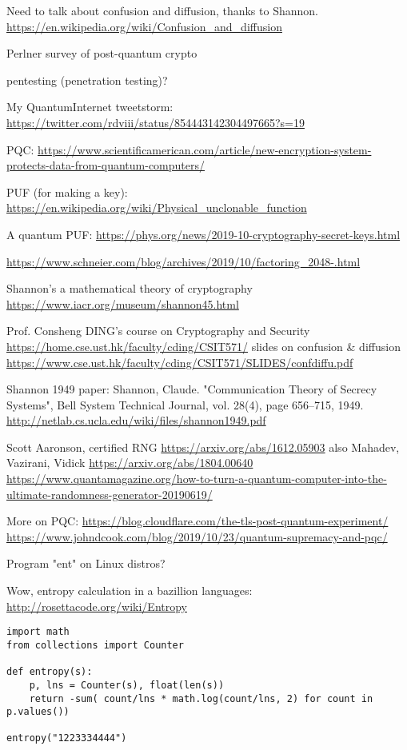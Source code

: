 \documentclass[%
 aip,
 jmp,%
 amsmath,amssymb,
 reprint,%
]{revtex4-1}
\begin{document}
Need to talk about confusion and diffusion, thanks to Shannon.
\url{https://en.wikipedia.org/wiki/Confusion_and_diffusion}

Perlner survey of post-quantum crypto

pentesting (penetration testing)?

My QuantumInternet tweetstorm:
\url{https://twitter.com/rdviii/status/854443142304497665?s=19}

PQC:
\url{https://www.scientificamerican.com/article/new-encryption-system-protects-data-from-quantum-computers/}

PUF (for making a key):
\url{https://en.wikipedia.org/wiki/Physical_unclonable_function}

A quantum PUF:
\url{https://phys.org/news/2019-10-cryptography-secret-keys.html}

\url{https://www.schneier.com/blog/archives/2019/10/factoring_2048-.html}

Shannon's a mathematical theory of cryptography
\url{https://www.iacr.org/museum/shannon45.html}

Prof. Consheng DING's course on Cryptography and Security
\url{https://home.cse.ust.hk/faculty/cding/CSIT571/}
slides on confusion \& diffusion
\url{https://www.cse.ust.hk/faculty/cding/CSIT571/SLIDES/confdiffu.pdf}

Shannon 1949 paper:
Shannon, Claude. "Communication Theory of Secrecy Systems", Bell System Technical Journal, vol. 28(4), page 656–715, 1949.
\url{http://netlab.cs.ucla.edu/wiki/files/shannon1949.pdf}

Scott Aaronson, certified RNG
\url{https://arxiv.org/abs/1612.05903}
also Mahadev, Vazirani, Vidick
\url{https://arxiv.org/abs/1804.00640}
\url{https://www.quantamagazine.org/how-to-turn-a-quantum-computer-into-the-ultimate-randomness-generator-20190619/}


More on PQC:
\url{https://blog.cloudflare.com/the-tls-post-quantum-experiment/}
\url{https://www.johndcook.com/blog/2019/10/23/quantum-supremacy-and-pqc/}

Program "ent" on Linux distros?

Wow, entropy calculation in a bazillion languages:
\url{http://rosettacode.org/wiki/Entropy}
\begin{verbatim}
import math
from collections import Counter

def entropy(s):
    p, lns = Counter(s), float(len(s))
    return -sum( count/lns * math.log(count/lns, 2) for count in p.values())

entropy("1223334444")
\end{verbatim}
\end{document}
